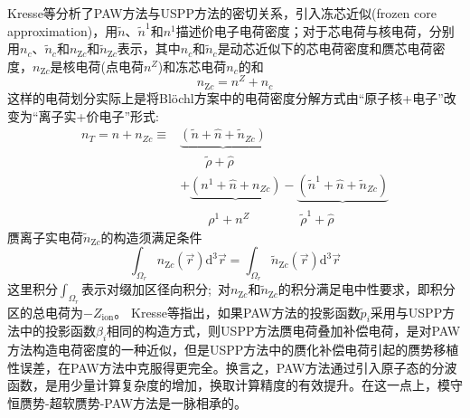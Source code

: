 {\textrm{Kresse}等分析了\textrm{PAW}方法与\textrm{USPP}方法的密切关系，引入冻芯近似(\textrm{frozen core approximation})，用$\tilde n$、$\tilde n^1$和$n^1$描述价电子电荷密度；对于芯电荷与核电荷，分别用$n_c$、$\tilde n_c$和$n_{\mathrm{Z}c}$和$\tilde n_{\mathrm{Z}c}$表示，其中$n_c$和$\tilde n_c$是动芯近似下的芯电荷密度和赝芯电荷密度，$n_{\mathrm{Z}c}$是核电荷(点电荷$n^Z$)和冻芯电荷$n_c$的和
\begin{displaymath}
	n_{\mathrm{Z}c}=n^Z+n_c
\end{displaymath}
这样的电荷划分实际上是将\textrm{Bl\"ochl}方案中的电荷密度分解方式由``原子核+电子''改变为``离子实+价电子''形式:~
\begin{equation}
	\begin{aligned}
		n_T=n+n_{Zc}\equiv&\underbrace{(\tilde n+\hat n+\tilde n_{Zc})}\\
				 		&\qquad\tilde\rho+\hat\rho\\
				  &+\underbrace{(n^1+\hat n+n_{Zc})}-\underbrace{(\tilde n^1+\hat n+\tilde n_{Zc})}\\
				                  &\qquad~ \rho^1+n^Z\qquad\quad\quad\tilde\rho^1+\hat\rho
	\end{aligned}
	\label{eq:PAW_Kresse_02}
\end{equation}
赝离子实电荷$\tilde n_{\mathrm{Z}c}$的构造须满足条件
\begin{equation}
	\int_{\Omega_r}n_{\mathrm{Z}c}(\vec r)\mathrm{d}^3\vec r=\int_{\Omega_r}\tilde n_{\mathrm{Z}c}(\vec r)\mathrm{d}^3\vec r
	\label{eq:PAW_Kresse_01}
\end{equation}
这里积分$\int_{\Omega_r}$表示对缀加区径向积分;~对$n_{\mathrm{Z}c}$和$\tilde n_{\mathrm{Z}c}$的积分满足电中性要求，即积分区的总电荷为$-Z_{\mathrm{ion}}$。%
\textrm{Kresse}等指出，如果\textrm{PAW}方法的投影函数$\tilde p_i$采用与\textrm{USPP}方法中的投影函数$\beta_i$相同的构造方式，则\textrm{USPP}方法赝电荷叠加补偿电荷，是对\textrm{PAW}方法构造电荷密度的一种近似，但是\textrm{USPP}方法中的赝化补偿电荷引起的赝势移植性误差，在\textrm{PAW}方法中克服得更完全。换言之，\textrm{PAW}方法通过引入原子态的分波函数，是用少量计算复杂度的增加，换取计算精度的有效提升。在这一点上，模守恒赝势-超软赝势-PAW方法是一脉相承的。

}
